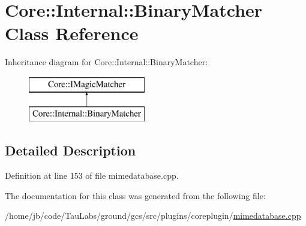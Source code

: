\hypertarget{class_core_1_1_internal_1_1_binary_matcher}{\section{\-Core\-:\-:\-Internal\-:\-:\-Binary\-Matcher \-Class \-Reference}
\label{class_core_1_1_internal_1_1_binary_matcher}
}
\-Inheritance diagram for \-Core\-:\-:\-Internal\-:\-:\-Binary\-Matcher\-:\begin{figure}[H]
\begin{center}
\leavevmode
\includegraphics[height=2.000000cm]{class_core_1_1_internal_1_1_binary_matcher}
\end{center}
\end{figure}


\subsection{\-Detailed \-Description}


\-Definition at line 153 of file mimedatabase.\-cpp.



\-The documentation for this class was generated from the following file\-:\begin{DoxyCompactItemize}
\item 
/home/jb/code/\-Tau\-Labs/ground/gcs/src/plugins/coreplugin/\hyperlink{mimedatabase_8cpp}{mimedatabase.\-cpp}\end{DoxyCompactItemize}
